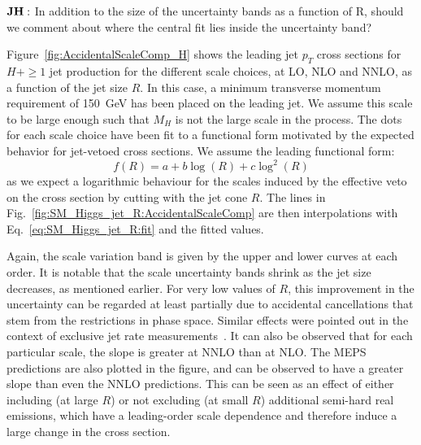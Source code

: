 \documentclass[aps,prd,onecolumn,fleqn,superscriptaddress,groupedaddress,nofootinbib,preprintnumbers,nobalancelastpage]{revtex4}
\begin{document}
$\bf JH:$ In addition to the size of the uncertainty bands as a function of R, should we comment about where the central fit lies inside the uncertainty band? 

Figure~\ref{fig:AccidentalScaleComp_H} shows the leading jet $p_T$ cross sections for $H +\ge1$ jet production for
the different scale choices, at LO, NLO and NNLO, as a function of the jet size $R$.
In this case, a minimum transverse momentum requirement of 150~GeV has been
placed on the leading jet.  We assume this scale to be large enough such that $M_H$
is not the large scale in the process.  The dots for each scale choice have been
fit to a functional form motivated by the expected behavior for jet-vetoed cross
sections.
We assume the leading functional form:
\begin{equation}
f(R)=a+b\log(R)+c\log^2(R) \label{eq:SM_Higgs_jet_R:fit}
\end{equation}
as we expect a logarithmic behaviour for the scales induced by the effective
veto on the cross section by cutting with the jet cone $R$.  The lines in
Fig.~\ref{fig:SM_Higgs_jet_R:AccidentalScaleComp} are then interpolations with 
Eq.~\eqref{eq:SM_Higgs_jet_R:fit} and the fitted values. 
 
Again, the scale variation band is given by the upper and lower curves at each
order. It is notable that the scale uncertainty bands shrink as the jet size
decreases, as mentioned earlier. For very low values of $R$, this improvement in
the uncertainty can be regarded at least partially due to accidental
cancellations that stem from the restrictions in phase space.  Similar effects
were pointed out in the context of exclusive jet rate
measurements~\cite{Stewart:2011cf}. It can also be observed that for each
particular scale, the slope is greater at NNLO than at NLO. The MEPS predictions
are also plotted in the figure, and can be observed to have a greater slope than
even the NNLO predictions.  This can be seen as an effect of either including
(at large $R$) or not excluding (at small $R$) additional semi-hard real emissions,
which have a leading-order scale dependence and therefore induce a large change
in the cross section.
\end{document}
